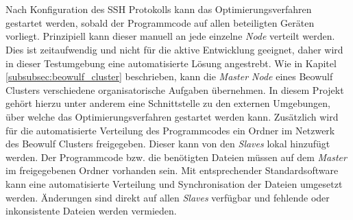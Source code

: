 \\\\
Nach Konfiguration des \ac{SSH} Protokolls kann das Optimierungsverfahren gestartet werden, sobald der Programmcode auf allen beteiligten Geräten vorliegt. Prinzipiell kann dieser manuell an jede einzelne \emph{Node} verteilt werden. Dies ist zeitaufwendig und nicht für die aktive Entwicklung geeignet, daher wird in dieser Testumgebung eine automatisierte Lösung angestrebt. Wie in Kapitel \ref{subsubsec:beowulf_cluster} beschrieben, kann die \emph{Master Node} eines Beowulf Clusters verschiedene organisatorische Aufgaben übernehmen. In diesem Projekt gehört hierzu unter anderem eine Schnittstelle zu den externen Umgebungen, über welche das Optimierungsverfahren gestartet werden kann. Zusätzlich wird für die automatisierte Verteilung des Programmcodes ein Ordner im Netzwerk des Beowulf Clusters freigegeben. Dieser kann von den \emph{Slaves} lokal hinzufügt werden. Der Programmcode bzw. die benötigten Dateien müssen auf dem \emph{Master} im freigegebenen Ordner vorhanden sein. Mit entsprechender Standardsoftware kann eine automatisierte Verteilung und Synchronisation der Dateien umgesetzt werden. Änderungen sind direkt auf allen \emph{Slaves} verfügbar und fehlende oder inkonsistente Dateien werden vermieden.
